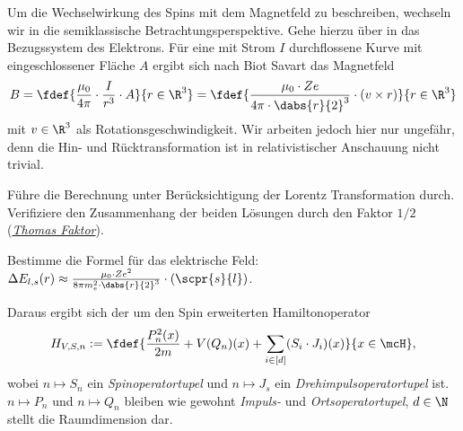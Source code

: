 \documentclass{subfiles}
\begin{document}

    Um die Wechselwirkung des Spins mit dem Magnetfeld zu beschreiben, wechseln wir in die semiklassische Betrachtungsperspektive. Gehe hierzu über in das Bezugssystem des Elektrons. Für eine mit Strom $I$ durchflossene Kurve mit eingeschlossener Fläche $A$ ergibt sich nach Biot Savart das Magnetfeld
    \[
        B = \fdef{\frac{\mu_0}{4\pi}\cdot\frac{I}{r^3}\cdot A}{r\in\R^3} = \fdef{
            \frac{\mu_0\cdot Ze}{4\pi\cdot \dabs{r}{2}^3}\cdot(v \times r)
        }{r\in\R^3}
    \]
    mit $v\in\R^3$ als Rotationsgeschwindigkeit. Wir arbeiten jedoch hier nur ungefähr, denn die Hin- und Rücktransformation ist in relativistischer Anschauung nicht trivial. 
    \begin{Aufgabe}
        \nr{} Führe die Berechnung unter Berücksichtigung der Lorentz Transformation durch. Verifiziere den Zusammenhang der beiden Lösungen durch den Faktor $1/2$ (\href{https://en.wikipedia.org/wiki/Thomas_precession}{\emph{Thomas Faktor}}). 

        \nr{} Bestimme die Formel für das elektrische Feld: $\Delta E_{l,s}(r) \approx \frac{\mu_0\cdot Ze^2}{8\pi m_e^2\cdot \dabs{r}{2}^3}\cdot(\scpr{s}{l})$.
    \end{Aufgabe}
    Daraus ergibt sich der um den Spin erweiterten Hamiltonoperator
    \[
        H_{V,S,n}:=\fdef{\frac{P_n^2(x)}{2m} + V(Q_n)(x) + \sum_{i\in[d]}(S_i\cdot J_i)(x)}{x\in\mcH},
    \]
    wobei $n\mapsto S_n$ ein \emph{Spinoperatortupel} und $n\mapsto J_s$ ein \emph{Drehimpulsoperatortupel} ist. $n\mapsto P_n$ und $n\mapsto Q_n$ bleiben wie gewohnt \emph{Impuls-} und \emph{Ortsoperatortupel}, $d\in\N$ stellt die Raumdimension dar.
\end{document}
